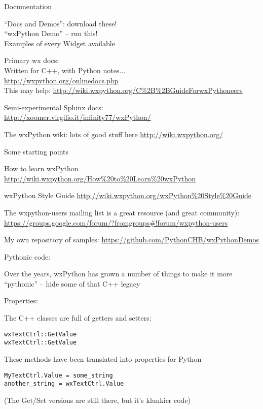\documentclass{beamer}
\begin{document}
\begin{frame}[fragile]{Documentation}

\vfill
{\Large ``Docs and Demos'': download these!}\\

\vfill
{\Large ``wxPython Demo'' -- run this!}\\
{\large Examples of every Widget available}

\vfill
{\Large Primary wx docs:}\\
{\large Written for C++, with Python notes...}\\
\url{http://wxpython.org/onlinedocs.php}\\
This may help: \url{http://wiki.wxpython.org/C%2B%2BGuideForwxPythoneers}

\vfill
{\large Semi-experimental Sphinx docs:}\\
\url{http://xoomer.virgilio.it/infinity77/wxPython/}

\vfill
{\Large The wxPython wiki: lots of good stuff here}
\url{http://wiki.wxpython.org/}

\end{frame}

\begin{frame}[fragile]{Some starting points}


\vfill
{\Large How to learn wxPython}
\url{http://wiki.wxpython.org/How%20to%20Learn%20wxPython}

\vfill
{\Large wxPython Style Guide}
\url{http://wiki.wxpython.org/wxPython%20Style%20Guide}

\vfill
{\Large The wxpython-users mailing list is a great resource (and great community):}\\
\url{https://groups.google.com/forum/?fromgroups#!forum/wxpython-users}

\vfill
{\large My own repository of samples:}
\url{https://github.com/PythonCHB/wxPythonDemos}

\end{frame}

\begin{frame}[fragile]{Pythonic code:}


\vfill
{\Large Over the years, wxPython has grown a number of things to make it more ``pythonic'' -- hide some of that C++ legacy}

\vfill
{\Large Properties:}

{\large The C++ classes are full of getters and setters:}
\begin{verbatim}
wxTextCtrl::GetValue
wxTextCtrl::GetValue
\end{verbatim}

{\large These methods have been translated into properties for Python}
\begin{verbatim}
MyTextCtrl.Value = some_string
another_string = wxTextCtrl.Value
\end{verbatim}

\vfill
(The Get/Set versions are still there, but it's klunkier code)
\end{frame}
\end{document}

